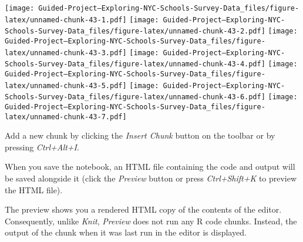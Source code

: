 \documentclass[]{article}
\begin{document}
\texttt{[image: Guided-Project--Exploring-NYC-Schools-Survey-Data\_files/figure-latex/unnamed-chunk-43-1.pdf]}
\texttt{[image: Guided-Project--Exploring-NYC-Schools-Survey-Data\_files/figure-latex/unnamed-chunk-43-2.pdf]}
\texttt{[image: Guided-Project--Exploring-NYC-Schools-Survey-Data\_files/figure-latex/unnamed-chunk-43-3.pdf]}
\texttt{[image: Guided-Project--Exploring-NYC-Schools-Survey-Data\_files/figure-latex/unnamed-chunk-43-4.pdf]}
\texttt{[image: Guided-Project--Exploring-NYC-Schools-Survey-Data\_files/figure-latex/unnamed-chunk-43-5.pdf]}
\texttt{[image: Guided-Project--Exploring-NYC-Schools-Survey-Data\_files/figure-latex/unnamed-chunk-43-6.pdf]}
\texttt{[image: Guided-Project--Exploring-NYC-Schools-Survey-Data\_files/figure-latex/unnamed-chunk-43-7.pdf]}

Add a new chunk by clicking the \emph{Insert Chunk} button on the
toolbar or by pressing \emph{Ctrl+Alt+I}.

When you save the notebook, an HTML file containing the code and output
will be saved alongside it (click the \emph{Preview} button or press
\emph{Ctrl+Shift+K} to preview the HTML file).

The preview shows you a rendered HTML copy of the contents of the
editor. Consequently, unlike \emph{Knit}, \emph{Preview} does not run
any R code chunks. Instead, the output of the chunk when it was last run
in the editor is displayed.
\end{document}
